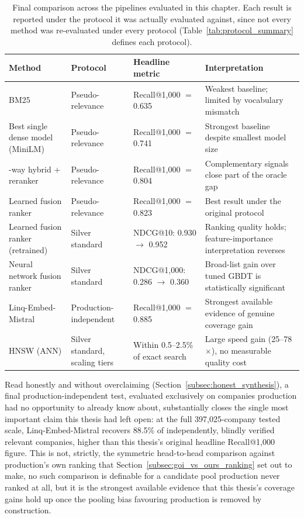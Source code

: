 \documentclass[a4paper,oneside,bibliography=totoc]{scrbook}
\begin{document}
\begin{table}[!htb]
\centering
\small
\caption{Final comparison across the pipelines evaluated in this chapter. Each result is reported under the protocol it was actually evaluated against, since not every method was re-evaluated under every protocol (Table~\ref{tab:protocol_summary} defines each protocol).}
\label{tab:final_comparison}
\begin{tabularx}{\textwidth}{>{\raggedright\arraybackslash}p{2.8cm}>{\raggedright\arraybackslash}p{2.4cm}>{\raggedright\arraybackslash}p{2.4cm}X}
\toprule
\textbf{Method} & \textbf{Protocol} & \textbf{Headline metric} & \textbf{Interpretation} \\
\midrule
BM25 & Pseudo-relevance & Recall@1{,}000 $=$ 0.635 & Weakest baseline; limited by vocabulary mismatch \\
Best single dense model (MiniLM) & Pseudo-relevance & Recall@1{,}000 $=$ 0.741 & Strongest baseline despite smallest model size \\
3-way hybrid + reranker & Pseudo-relevance & Recall@1{,}000 $=$ 0.804 & Complementary signals close part of the oracle gap \\
Learned fusion ranker & Pseudo-relevance & Recall@1{,}000 $=$ 0.823 & Best result under the original protocol \\
Learned fusion ranker (retrained) & Silver standard & NDCG@10: 0.930 $\to$ 0.952 & Ranking quality holds; feature-importance interpretation reverses \\
Neural network fusion ranker & Silver standard & NDCG@1{,}000: 0.286 $\to$ 0.360 & Broad-list gain over tuned GBDT is statistically significant \\
Linq-Embed-Mistral & Production-independent & Recall@1{,}000 $=$ 0.885 & Strongest available evidence of genuine coverage gain \\
HNSW (ANN) & Silver standard, scaling tiers & Within 0.5--2.5\% of exact search & Large speed gain (25--78$\times$), no measurable quality cost \\
\bottomrule
\end{tabularx}
\end{table}

Read honestly and without overclaiming (Section~\ref{subsec:honest_synthesis}), a final production-independent test, evaluated exclusively on companies production had no opportunity to already know about, substantially closes the single most important claim this thesis had left open: at the full 397,025-company tested scale, Linq-Embed-Mistral recovers 88.5\% of independently, blindly verified relevant companies, higher than this thesis's original headline Recall@1{,}000 figure. This is not, strictly, the symmetric head-to-head comparison against production's own ranking that Section~\ref{subsec:goi_vs_ours_ranking} set out to make, no such comparison is definable for a candidate pool production never ranked at all, but it is the strongest available evidence that this thesis's coverage gains hold up once the pooling bias favouring production is removed by construction.
\end{document}
